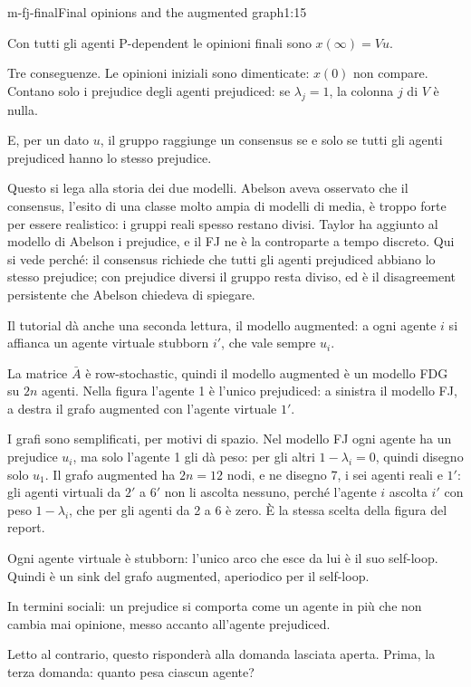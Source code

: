 \begin{slide}{m-fj-final}{Final opinions and the augmented graph}{1:15}
  \begin{discorso}
    \item Con tutti gli agenti P-dependent le opinioni finali sono $x(\infty)=Vu$.
    \item Tre conseguenze. Le opinioni iniziali sono dimenticate: $x(0)$ non compare. Contano solo i prejudice degli agenti prejudiced: se $\lambda_j=1$, la colonna $j$ di $V$ è nulla.
    \item E, per un dato $u$, il gruppo raggiunge un consensus se e solo se tutti gli agenti prejudiced hanno lo stesso prejudice.
    \item Questo si lega alla storia dei due modelli. Abelson aveva osservato che il consensus, l'esito di una classe molto ampia di modelli di media, è troppo forte per essere realistico: i gruppi reali spesso restano divisi. Taylor ha aggiunto al modello di Abelson i prejudice, e il FJ ne è la controparte a tempo discreto. Qui si vede perché: il consensus richiede che tutti gli agenti prejudiced abbiano lo stesso prejudice; con prejudice diversi il gruppo resta diviso, ed è il disagreement persistente che Abelson chiedeva di spiegare.
    \item Il tutorial dà anche una seconda lettura, il modello augmented: a ogni agente $i$ si affianca un agente virtuale stubborn $i'$, che vale sempre $u_i$.
    \item La matrice $\bar A$ è row-stochastic, quindi il modello augmented è un modello FDG su $2n$ agenti. Nella figura l'agente 1 è l'unico prejudiced: a sinistra il modello FJ, a destra il grafo augmented con l'agente virtuale $1'$.
    \item I grafi sono semplificati, per motivi di spazio. Nel modello FJ ogni agente ha un prejudice $u_i$, ma solo l'agente 1 gli dà peso: per gli altri $1-\lambda_i=0$, quindi disegno solo $u_1$. Il grafo augmented ha $2n=12$ nodi, e ne disegno 7, i sei agenti reali e $1'$: gli agenti virtuali da $2'$ a $6'$ non li ascolta nessuno, perché l'agente $i$ ascolta $i'$ con peso $1-\lambda_i$, che per gli agenti da 2 a 6 è zero. È la stessa scelta della figura del report.
    \item Ogni agente virtuale è stubborn: l'unico arco che esce da lui è il suo self-loop. Quindi è un sink del grafo augmented, aperiodico per il self-loop.
    \item In termini sociali: un prejudice si comporta come un agente in più che non cambia mai opinione, messo accanto all'agente prejudiced.
    \item Letto al contrario, questo risponderà alla domanda lasciata aperta. Prima, la terza domanda: quanto pesa ciascun agente?
  \end{discorso}
\end{slide}

